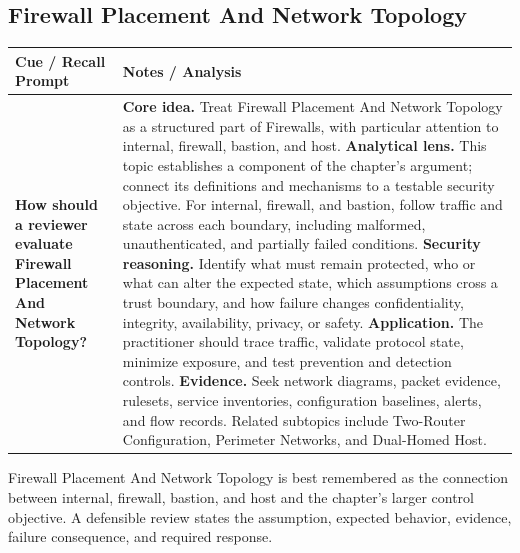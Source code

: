 \documentclass[11pt]{article}
\newcommand{\CornellHeader}{%
\rowcolor{Navy}\color{white}\bfseries Cue / Recall Prompt & \color{white}\bfseries Notes / Analysis\\\hline}
\newcommand{\CornellRow}[2]{%
\cellcolor{CueGray}\RaggedRight\textbf{#1} & \RaggedRight #2\\\hline}
\begin{document}
\subsection*{Firewall Placement And Network Topology}
\begin{longtable}{>{\RaggedRight\arraybackslash}p{}|>{\RaggedRight\arraybackslash}p{}}
\CornellHeader
\CornellRow{How should a reviewer evaluate Firewall Placement And Network Topology?}{\textbf{Core idea.} Treat Firewall Placement And Network Topology as a structured part of Firewalls, with particular attention to internal, firewall, bastion, and host. \textbf{Analytical lens.} This topic establishes a component of the chapter's argument; connect its definitions and mechanisms to a testable security objective. For internal, firewall, and bastion, follow traffic and state across each boundary, including malformed, unauthenticated, and partially failed conditions. \textbf{Security reasoning.} Identify what must remain protected, who or what can alter the expected state, which assumptions cross a trust boundary, and how failure changes confidentiality, integrity, availability, privacy, or safety. \textbf{Application.} The practitioner should trace traffic, validate protocol state, minimize exposure, and test prevention and detection controls. \textbf{Evidence.} Seek network diagrams, packet evidence, rulesets, service inventories, configuration baselines, alerts, and flow records. Related subtopics include Two-Router Configuration, Perimeter Networks, and Dual-Homed Host.}
\end{longtable}
\begin{topicsummary}
Firewall Placement And Network Topology is best remembered as the connection between internal, firewall, bastion, and host and the chapter's larger control objective. A defensible review states the assumption, expected behavior, evidence, failure consequence, and required response.
\end{topicsummary}
\end{document}

